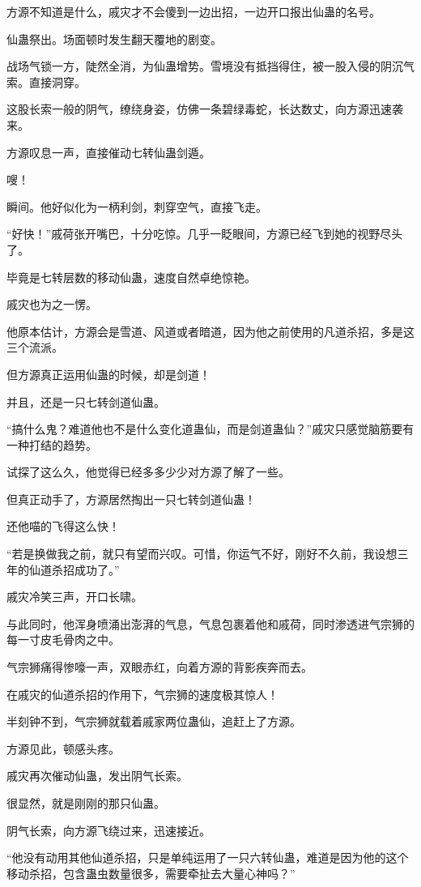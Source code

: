 \begin{this_body}
方源不知道是什么，戚灾才不会傻到一边出招，一边开口报出仙蛊的名号。

仙蛊祭出。场面顿时发生翻天覆地的剧变。

战场气锁一方，陡然全消，为仙蛊增势。雪境没有抵挡得住，被一股入侵的阴沉气索。直接洞穿。

这股长索一般的阴气，缭绕身姿，仿佛一条碧绿毒蛇，长达数丈，向方源迅速袭来。

方源叹息一声，直接催动七转仙蛊剑遁。

嗖！

瞬间。他好似化为一柄利剑，刺穿空气，直接飞走。

“好快！”戚荷张开嘴巴，十分吃惊。几乎一眨眼间，方源已经飞到她的视野尽头了。

毕竟是七转层数的移动仙蛊，速度自然卓绝惊艳。

戚灾也为之一愣。

他原本估计，方源会是雪道、风道或者暗道，因为他之前使用的凡道杀招，多是这三个流派。

但方源真正运用仙蛊的时候，却是剑道！

并且，还是一只七转剑道仙蛊。

“搞什么鬼？难道他也不是什么变化道蛊仙，而是剑道蛊仙？”戚灾只感觉脑筋要有一种打结的趋势。

试探了这么久，他觉得已经多多少少对方源了解了一些。

但真正动手了，方源居然掏出一只七转剑道仙蛊！

还他喵的飞得这么快！

“若是换做我之前，就只有望而兴叹。可惜，你运气不好，刚好不久前，我设想三年的仙道杀招成功了。”

戚灾冷笑三声，开口长啸。

与此同时，他浑身喷涌出澎湃的气息，气息包裹着他和戚荷，同时渗透进气宗狮的每一寸皮毛骨肉之中。

气宗狮痛得惨嚎一声，双眼赤红，向着方源的背影疾奔而去。

在戚灾的仙道杀招的作用下，气宗狮的速度极其惊人！

半刻钟不到，气宗狮就载着戚家两位蛊仙，追赶上了方源。

方源见此，顿感头疼。

戚灾再次催动仙蛊，发出阴气长索。

很显然，就是刚刚的那只仙蛊。

阴气长索，向方源飞绕过来，迅速接近。

“他没有动用其他仙道杀招，只是单纯运用了一只六转仙蛊，难道是因为他的这个移动杀招，包含蛊虫数量很多，需要牵扯去大量心神吗？”


\end{this_body}
